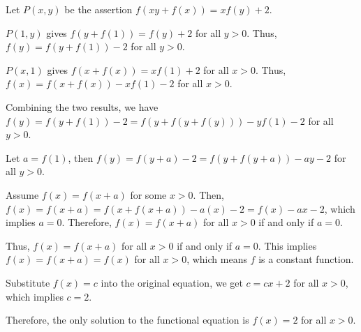 Let $P(x,y)$ be the assertion $f(xy+f(x)) = xf(y) + 2$.

$P(1,y)$ gives $f(y+f(1)) = f(y) + 2$ for all $y>0$. Thus, $f(y) = f(y+f(1))-2$ for all $y>0$.

$P(x,1)$ gives $f(x+f(x)) = xf(1) + 2$ for all $x>0$. Thus, $f(x) = f(x+f(x))-xf(1)-2$ for all $x>0$.

Combining the two results, we have $f(y) = f(y+f(1))-2 = f(y+f(y+f(y)))-yf(1)-2$ for all $y>0$.

Let $a = f(1)$, then $f(y) = f(y+a)-2 = f(y+f(y+a))-ay-2$ for all $y>0$.

Assume $f(x) = f(x+a)$ for some $x>0$. Then, $f(x) = f(x+a) = f(x+f(x+a))-a(x)-2 = f(x)-ax-2$, which implies $a=0$. Therefore, $f(x) = f(x+a)$ for all $x>0$ if and only if $a=0$.

Thus, $f(x) = f(x+a)$ for all $x>0$ if and only if $a=0$. This implies $f(x) = f(x+a) = f(x)$ for all $x>0$, which means $f$ is a constant function.

Substitute $f(x) = c$ into the original equation, we get $c = cx + 2$ for all $x>0$, which implies $c=2$.

Therefore, the only solution to the functional equation is $f(x) = 2$ for all $x>0$.
